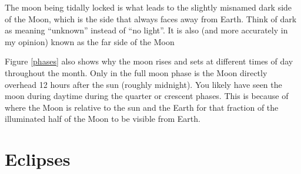 \documentclass[12pt]{book}
\begin{document}
The moon being tidally locked is what leads to the slightly misnamed dark side of the Moon, which is the side that always faces away from Earth. Think of dark as meaning ``unknown'' instead of ``no light''. It is also (and more accurately in my opinion) known as the far side of the Moon

Figure \ref{phases} also shows why the moon rises and sets at different times of day throughout the month. Only in the full moon phase is the Moon directly overhead 12 hours after the sun (roughly midnight). You likely have seen the moon during daytime during the quarter or crescent phases. This is because of where the Moon is relative to the sun and the Earth for that fraction of the illuminated half of the Moon to be visible from Earth.

\section{Eclipses}
\end{document}
